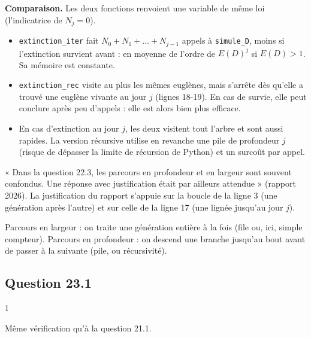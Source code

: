 \documentclass[11pt,a4paper]{article}
\providecommand{\tightlist}{\setlength{\itemsep}{0pt}\setlength{\parskip}{0pt}}
\begin{document}
\textbf{Comparaison.} Les deux fonctions renvoient une variable de même loi (l'indicatrice de \(N_j=0\)).

\begin{itemize}
\tightlist
\item
  \texttt{extinction\_iter} fait \(N_0+N_1+\dots+N_{j-1}\) appels à \texttt{simule\_D}, moins si l'extinction survient avant : en moyenne de l'ordre de \(E(D)^j\) si \(E(D)>1\). Sa mémoire est constante.
\item
  \texttt{extinction\_rec} visite au plus les mêmes euglènes, mais s'arrête dès qu'elle a trouvé une euglène vivante au jour \(j\) (lignes 18-19). En cas de survie, elle peut conclure après peu d'appels : elle est alors bien plus efficace.
\item
  En cas d'extinction au jour \(j\), les deux visitent tout l'arbre et sont aussi rapides. La version récursive utilise en revanche une pile de profondeur \(j\) (risque de dépasser la limite de récursion de Python) et un surcoût par appel.
\end{itemize}

\begin{jury}

« Dans la question 22.3, les parcours en profondeur et en largeur sont souvent confondus. Une réponse avec justification était par ailleurs attendue » (rapport 2026). La justification du rapport s'appuie sur la boucle de la ligne 3 (une génération après l'autre) et sur celle de la ligne 17 (une lignée jusqu'au jour \(j\)).

\end{jury}

\begin{methode}

Parcours en largeur : on traite une génération entière à la fois (file ou, ici, simple compteur). Parcours en profondeur : on descend une branche jusqu'au bout avant de passer à la suivante (pile, ou récursivité).

\end{methode}

\hypertarget{question-23.1}{%
\subsection{Question 23.1}\label{question-23.1}}

\begin{indication}{1}

Même vérification qu'à la question 21.1.

\end{indication}
\end{document}
